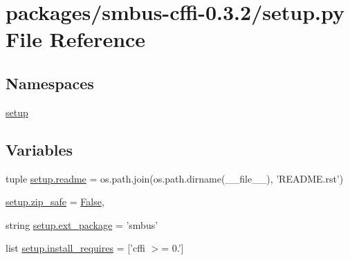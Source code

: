 \hypertarget{packages_2smbus-cffi-0_83_82_2setup_8py}{}\section{packages/smbus-\/cffi-\/0.3.2/setup.py File Reference}
\label{packages_2smbus-cffi-0_83_82_2setup_8py}
\subsection*{Namespaces}
\begin{DoxyCompactItemize}
\item 
 \hyperlink{namespacesetup}{setup}
\end{DoxyCompactItemize}
\subsection*{Variables}
\begin{DoxyCompactItemize}
\item 
tuple \hyperlink{namespacesetup_a42fc6e0a39b8505916316a384b3433d5}{setup.\+readme} = os.\+path.\+join(os.\+path.\+dirname(\+\_\+\+\_\+file\+\_\+\+\_\+), 'R\+E\+A\+D\+M\+E.\+rst')
\item 
\hyperlink{namespacesetup_a13510753661cb74083a0c664db11dde9}{setup.\+zip\+\_\+safe} = \hyperlink{libqhull_8h_a306ebd41c0cd1303b1372c6153f0caf8}{False},
\item 
string \hyperlink{namespacesetup_afa1a87f702080d5171df46e4428805a6}{setup.\+ext\+\_\+package} = 'smbus'
\item 
list \hyperlink{namespacesetup_a7cd8314075060c603cd2622ada2c2fbe}{setup.\+install\+\_\+requires} = \mbox{[}'cffi $>$= 0.'\mbox{]}
\end{DoxyCompactItemize}
